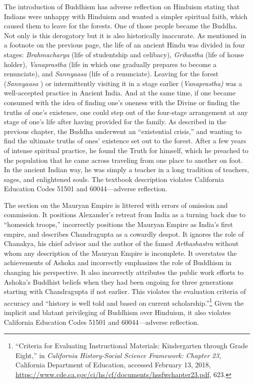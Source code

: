 The introduction of Buddhism has adverse reflection on Hinduism stating that Indians were unhappy with Hinduism and wanted a simpler spiritual faith, which caused them to leave for the forests. One of those people became the Buddha. Not only is this derogatory but it is also historically inaccurate. As mentioned in a footnote on the previous page, the life of an ancient Hindu was divided in four stages: \textit{Brahmacharya}  (life of studentship and celibacy), \textit{Grihastha}  (life of house holder), \textit{Vanaprastha}  (life in which one gradually prepares to become a renunciate), and \textit{Sannyaasa}  (life of a renunciate). Leaving for the forest (\textit{Sannyaasa} ) or intermittently visiting it in a stage earlier (\textit{Vanaprastha)}  was a well-accepted practice in Ancient India. And at the same time, if one became consumed with the idea of finding one’s oneness with the Divine or finding the truths of one’s existence, one could step out of the four-stage arrangement at any stage of one’s life after having provided for the family. As described in the previous chapter, the Buddha underwent an “existential crisis,” and wanting to find the ultimate truths of ones’ existence set out to the forest. After a few years of intense spiritual practice, he found the Truth for himself, which he preached to the population that he came across traveling from one place to another on foot. In the ancient Indian way, he was simply a teacher in a long tradition of teachers, sages, and enlightened souls. The textbook description violates California Education Codes 51501 and 60044—adverse reflection.  

The section on the Mauryan Empire is littered with errors of omission and commission. It positions Alexander’s retreat from India as a turning back due to “homesick troops,” incorrectly positions the Mauryan Empire as India’s first empire, and describes Chandragupta as a cowardly despot. It ignores the role of Chanakya, his chief advisor and the author of the famed \textit{Arthashastra}  without whom any description of the Mauryan Empire is incomplete. It overstates the achievements of Ashoka and incorrectly emphasizes the role of Buddhism in changing his perspective. It also incorrectly attributes the public work efforts to Ashoka’s Buddhist beliefs when they had been ongoing for three generations starting with Chandragupta if not earlier. This violates the evaluation criteria of accuracy and “history is well told and based on current scholarship.”\footnote{“Criteria for Evaluating Instructional Materials: Kindergarten through Grade Eight,” in \textit{California History-Social Science Framework: Chapter 23}, California Department of Education, accessed February 13, 2018, \url{https://www.cde.ca.gov/ci/hs/cf/documents/hssfwchapter23.pdf}, 623.} Given the implicit and blatant privileging of Buddhism over Hinduism, it also violates California Education Codes 51501 and 60044—adverse reflection.  

